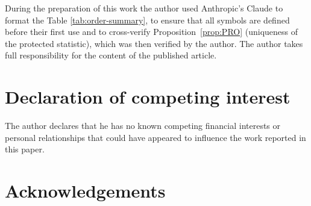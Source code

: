 \documentclass[a4paper,fleqn]{cas-sc}
\theoremstyle{remark}
\theoremstyle{definition}
\begin{document}
During the preparation of this work the author used Anthropic's Claude to format the Table \ref{tab:order-summary}, to ensure that all symbols are defined before their first use and to cross-verify
Proposition~\ref{prop:PRO} (uniqueness of the protected statistic), which was then verified by the author. The author takes full responsibility for the content of the published article.

\section*{Declaration of competing interest}

The author declares that he has no known competing financial interests or personal relationships
that could have appeared to influence the work reported in this paper.

\section*{Acknowledgements}



\end{document}
